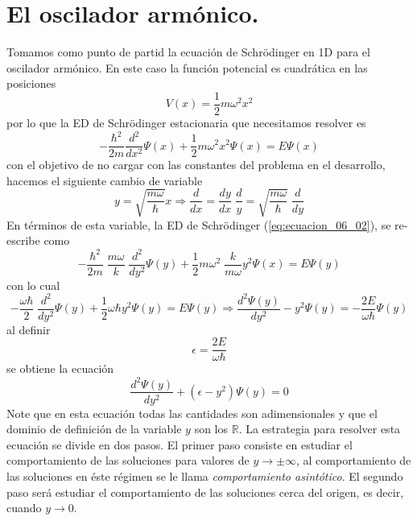 \section*{El oscilador armónico.}
Tomamos como punto de partid la ecuación de Schrödinger en 1D para el oscilador armónico. En este caso la función potencial es cuadrática en las posiciones
\begin{equation}
V(x) =  \dfrac{1}{2} m \omega^{2} x^{2} 
\label{eq:ecuacion_06_01}
\end{equation}
por lo que la ED de Schrödinger estacionaria que necesitamos resolver es
\begin{equation}
- \dfrac{\hbar^{2}}{2m} \dfrac{d^{2}}{d x^{2}} \Psi(x) + \dfrac{1}{2} m \omega^{2} x^{2} \Psi(x) =  E \Psi(x)
\label{eq:ecuacion_06_02}
\end{equation}
con el objetivo de no cargar con las constantes del problema en el desarrollo, hacemos el siguiente cambio de variable
\begin{equation}
y = \sqrt{\dfrac{m \omega}{\hbar}} x \Rightarrow \dfrac{d}{dx} = \dfrac{d y}{d x} \; \dfrac{d}{y} = \sqrt{\dfrac{m \omega}{\hbar}} \; \dfrac{d}{dy}
\label{eq:ecuacion_06_03}
\end{equation}
En términos de esta variable, la ED de Schrödinger (\ref{eq:ecuacion_06_02}), se re-escribe como
\begin{equation}
- \dfrac{\hbar^{2}}{2m} \; \dfrac{m \omega}{k} \; \dfrac{d^{2}}{d y^{2}} \Psi(y) + \dfrac{1}{2} m \omega^{2} \; \dfrac{k}{m \omega} y^{2} \Psi(x) =  E \Psi(y)
\label{eq:ecuacion_06_05}
\end{equation}
con lo cual
\[ - \dfrac{\omega \hbar}{2} \; \dfrac{d^{2}}{d y^{2}} \Psi(y) + \dfrac{1}{2} \omega \hbar y^{2} \Psi(y) =  E \Psi(y) \Rightarrow \dfrac{d^{2} \Psi (y)}{d y^{2}} - y^{2} \Psi(y) = - \dfrac{2 E}{\omega \hbar} \Psi (y) \]
al definir
\[ \epsilon = \frac{2E}{\omega \hbar} \]
se obtiene la ecuación
\begin{equation}
\dfrac{d^{2} \Psi (y)}{d y^{2}} + (\epsilon - y^{2}) \Psi (y) = 0
\label{eq:ecuacion_06_06}
\end{equation}
Note que en esta ecuación todas las cantidades son adimensionales y que el dominio de definición de la variable $y$ son los $\mathbb{R}$. La estrategia para resolver esta ecuación se divide en dos pasos. El primer paso consiste en estudiar el comportamiento de las soluciones para valores de $y \to \pm \infty$, al comportamiento de las soluciones en éste régimen se le llama \emph{comportamiento asintótico}. El segundo paso será estudiar el comportamiento de las soluciones cerca del origen, es decir, cuando $y \to 0$.
